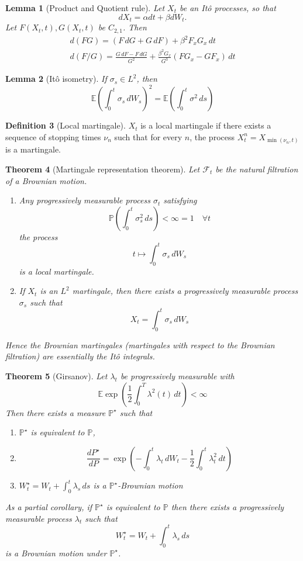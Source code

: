 \documentclass[10pt, oneside, reqno]{amsart}
\theoremstyle{plain}%
\newtheorem{thm}{Theorem}[section]
\newtheorem{lem}[thm]{Lemma}
\numberwithin{equation}{section}
\theoremstyle{definition}
\newtheorem{defn}[thm]{Definition}
\theoremstyle{remark}
\newcommand{\sigf}{\mathcal{F}}
\newcommand{\E}{\mathbb{E}}
\renewcommand{\P}{\mathbb{P}}
\begin{document}
\begin{lem}[Product and Quotient rule]
    Let $X_t$ be an It\^o processes, so that \[
        dX_t = \alpha dt + \beta dW_t.
    \]  Let $F(X_t, t), G(X_t, t)$ be $C_{2, 1}$. Then \begin{align*}
        d(FG) = (F\, dG + G \, dF) + \beta^2 F_x G_x \, dt \\
        d(F/G) = \frac{G \, dF - F \, dG}{G^2} + \frac{\beta^2 G_x}{G^3}(FG_x - GF_x) \, dt
    \end{align*}
\end{lem}

\begin{lem}[It\^o isometry]
    If $\sigma_s \in L^2$, then \[
        \E(\int_0^t \sigma_s \, dW_s)^2 = \E(\int_0^t \sigma^2 \, ds)
    \]
\end{lem}

\begin{defn}[Local martingale]
    $X_t$ is a local martingale if there exists a sequence of stopping times $\nu_n$ such that for every $n$, the process $X^n_t = X_{\min(\nu_n, t)}$ is a martingale.  
\end{defn}

\begin{thm}[Martingale representation theorem]
    Let $\sigf_t$ be the natural filtration of a Brownian motion.  \begin{enumerate}
        \item Any progressively measurable process $\sigma_t$ satisfying \[\P(\int_0^t \sigma_s^2 \, ds) < \infty = 1 \quad \forall t \] the process \[
            t \mapsto \int_0^t \sigma_s \, dW_s
        \] is a local martingale. 
        \item If $X_t$ is an $L^2$ martingale, then there exists a progressively measurable process $\sigma_s$ such that \[
            X_t = \int_0^t \sigma_s \, dW_s
        \] 
    \end{enumerate}
    
    Hence the Brownian martingales (martingales with respect to the Brownian filtration) are essentially the It\^o integrals.
\end{thm}

\begin{thm}[Girsanov]
    Let $\lambda_t$ be progressively measurable with \[
        \E\exp(\frac{1}{2} \int_0^T \lambda^2(t) \, dt) < \infty
    \] Then there exists a measure $\P^\star$ such that \begin{enumerate}
        \item $\P^\star$ is equivalent to $\P$, 
        \item \[
        \frac{dP^\star}{dP} = \exp( - \int_0^t \lambda_t \, dW_t - \frac{1}{2} \int_0^t \lambda^2_t \, dt )
        \]
        \item $W^\star_t = W_t + \int_0^t \lambda_s \, ds$ is a $\P^\star$-Brownian motion
    \end{enumerate} 
    
    As a partial corollary, if $\P^\star$ is equivalent to $\P$ then there exists a progressively measurable process $\lambda_t$ such that \[
        W^\star_t = W_t + \int_0^t \lambda_s \, ds
    \] is a Brownian motion under $\P^\star$.  
\end{thm}
\end{document}
